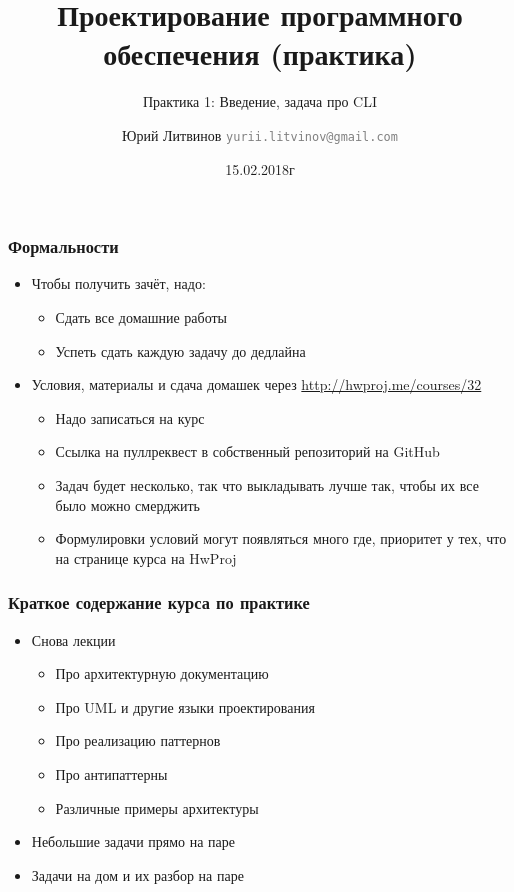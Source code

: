 \documentclass[xetex,mathserif,serif]{beamer}
\title{Проектирование программного обеспечения (практика)}
\subtitle{Практика 1: Введение, задача про CLI}
\author[Юрий Литвинов]{Юрий Литвинов \newline \textcolor{gray}{\small\texttt{yurii.litvinov@gmail.com}}}
\date{15.02.2018г}
\begin{document}
	
	\frame{\titlepage}
	
	\begin{frame}
		\frametitle{Формальности}
		\begin{itemize}
			\item Чтобы получить зачёт, надо:
			\begin{itemize}
				\item Сдать все домашние работы
				\item Успеть сдать каждую задачу до дедлайна
			\end{itemize}
			\item Условия, материалы и сдача домашек через \url{http://hwproj.me/courses/32}
			\begin{itemize}
				\item Надо записаться на курс
			\end{itemize}
			\begin{itemize}
				\item Ссылка на пуллреквест в собственный репозиторий на GitHub
				\item Задач будет несколько, так что выкладывать лучше так, чтобы их все было можно смерджить
				\item Формулировки условий могут появляться много где, приоритет у тех, что на странице курса на HwProj
			\end{itemize}
		\end{itemize}
	\end{frame}

	\begin{frame}
		\frametitle{Краткое содержание курса по практике}
		\begin{itemize}
			\item Снова лекции
			\begin{itemize}
				\item Про архитектурную документацию
				\item Про UML и другие языки проектирования
				\item Про реализацию паттернов
				\item Про антипаттерны
				\item Различные примеры архитектуры
			\end{itemize}
			\item Небольшие задачи прямо на паре
			\item Задачи на дом и их разбор на паре
		\end{itemize}
	\end{frame}
	
\end{document}
